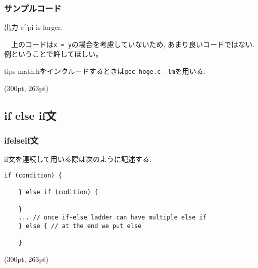 \documentclass[dvipdfmx]{beamer}
\begin{document}
\begin{frame}[t, fragile]
    \frametitle{サンプルコード}
    \begin{block}{出力}
        e\textasciicircum pi is larger.
    \end{block}
    　上のコードは\texttt{x = y}の場合を考慮していないため,
    あまり良いコードではない.例ということで許してほしい。
    \begin{itembox}[l]{tips}
    math.hをインクルードするときは\texttt{gcc hoge.c -lm}を用いる.
    \end{itembox}
    \begin{textblock*}{0.3\linewidth}(300pt, 263pt)
    \space
    \end{textblock*}
\end{frame}

\subsection{if else if文}
\begin{frame}[t, fragile]
    \frametitle{if\space else\space if文}
    if文を連続して用いる際は次のように記述する.
    \begin{lstlisting}[gobble=3, caption=Syntax\space of\space if-else-if, label=if_howto]
    if (condition) {
    
    } else if (codition) {
    
    }
    ... // once if-else ladder can have multiple else if
    } else { // at the end we put else

    }
    \end{lstlisting}
    \begin{textblock*}{0.3\linewidth}(300pt, 263pt)
    \space
    \end{textblock*}
\end{frame}
\end{document}
